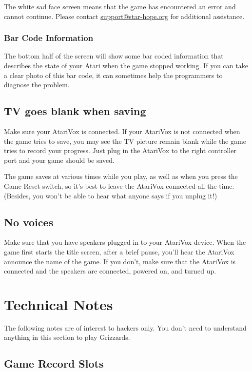 \documentclass[10pt,twoside,openright]{memoir}
\begin{document}
The white sad  face screen means that the game  has encountered an error and
cannot continue.  Please contact
\href{mailto:support@star-hope.org}{support@star-hope.org} for additional
assistance.

\subsection{Bar Code Information}

The bottom half of the screen will show some bar coded information
that describes the state of your Atari when the game stopped
working. If you can take a clear photo of this bar code, it can
sometimes help the programmers to diagnose the problem.

\section{TV goes blank when saving}

Make sure your AtariVox is connected. If your AtariVox is not
connected when the game tries to save, you may see the TV picture
remain blank while the game tries to record your progress. Just plug
in the AtariVox to the right controller port and your game should be
saved.

The game saves at various times while you play, as well as when you
press the Game Reset switch, so it's best to leave the AtariVox
connected all the time. (Besides, you won't be able to hear what
anyone says if you unplug it!)

\section{No voices}

Make sure that you have speakers plugged in to your AtariVox
device. When the game first starts the title screen, after a brief
pause, you'll hear the AtariVox announce the name of the game. If you
don't, make sure that the AtariVox is connected and the speakers are
connected, powered on, and turned up.

\chapter{Technical Notes}

The following notes are of interest to hackers only. You don't need to
understand anything in this section to play Grizzards.

\section{Game Record Slots}
\end{document}

